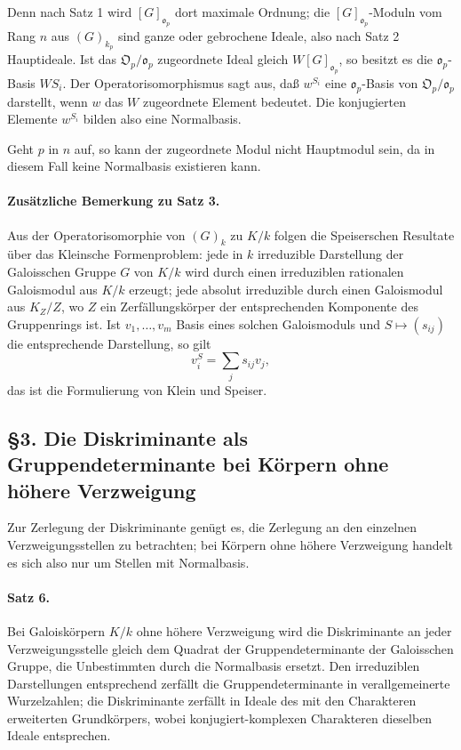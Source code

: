 \documentclass[11pt]{article}
\providecommand{\frako}{\mathfrak o}
\providecommand{\frakO}{\mathfrak O}
\begin{document}
Denn nach Satz 1 wird \([G]_{\frako_p}\) dort maximale Ordnung; die \([G]_{\frako_p}\)-Moduln vom Rang \(n\) aus \((G)_{k_p}\) sind ganze oder gebrochene Ideale, also nach Satz 2 Hauptideale. Ist das \(\frakO_p/\frako_p\) zugeordnete Ideal gleich \(W[G]_{\frako_p}\), so besitzt es die \(\frako_p\)-Basis \(WS_i\). Der Operatorisomorphismus sagt aus, daß \(w^{S_i}\) eine \(\frako_p\)-Basis von \(\frakO_p/\frako_p\) darstellt, wenn \(w\) das \(W\) zugeordnete Element bedeutet. Die konjugierten Elemente \(w^{S_i}\) bilden also eine Normalbasis.

Geht \(p\) in \(n\) auf, so kann der zugeordnete Modul nicht Hauptmodul sein, da in diesem Fall keine Normalbasis existieren kann.

\paragraph{Zusätzliche Bemerkung zu Satz 3.}
Aus der Operatorisomorphie von \((G)_k\) zu \(K/k\) folgen die Speiserschen Resultate über das Kleinsche Formenproblem: jede in \(k\) irreduzible Darstellung der Galoisschen Gruppe \(G\) von \(K/k\) wird durch einen irreduziblen rationalen Galoismodul aus \(K/k\) erzeugt; jede absolut irreduzible durch einen Galoismodul aus \(K_Z/Z\), wo \(Z\) ein Zerfällungskörper der entsprechenden Komponente des Gruppenrings ist. Ist \(v_1,\ldots,v_m\) Basis eines solchen Galoismoduls und \(S\mapsto (s_{ij})\) die entsprechende Darstellung, so gilt
\[
        v_i^S=\sum_j s_{ij}v_j,
\]
das ist die Formulierung von Klein und Speiser.

\subsection*{§3. Die Diskriminante als Gruppendeterminante bei Körpern ohne höhere Verzweigung}

Zur Zerlegung der Diskriminante genügt es, die Zerlegung an den einzelnen Verzweigungsstellen zu betrachten; bei Körpern ohne höhere Verzweigung handelt es sich also nur um Stellen mit Normalbasis.

\paragraph{Satz 6.}
Bei Galoiskörpern \(K/k\) ohne höhere Verzweigung wird die Diskriminante an jeder Verzweigungsstelle gleich dem Quadrat der Gruppendeterminante der Galoisschen Gruppe, die Unbestimmten durch die Normalbasis ersetzt. Den irreduziblen Darstellungen entsprechend zerfällt die Gruppendeterminante in verallgemeinerte Wurzelzahlen; die Diskriminante zerfällt in Ideale des mit den Charakteren erweiterten Grundkörpers, wobei konjugiert-komplexen Charakteren dieselben Ideale entsprechen.
\end{document}
